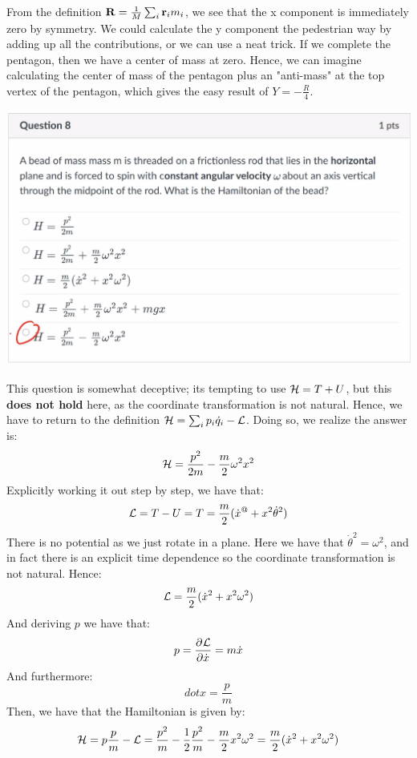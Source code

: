 \begin{s}
From the definition $\mathbf{R} = \frac{1}{M}\sum_i \mathbf{r}_im_i$, we see that the x component is immediately zero by symmetry. We could calculate the y component the pedestrian way by adding up all the contributions, or we can use a neat trick. If we complete the pentagon, then we have a center of mass at zero. Hence, we can imagine calculating the center of mass of the pentagon plus an "anti-mass" at the top vertex of the pentagon, which gives the easy result of $Y = -\frac{R}{4}$.
\end{s}

\begin{center}
    \includegraphics[scale=0.7]{Lecture-34/l34-img5.png}
\end{center}
\begin{s}
This question is somewhat deceptive; its tempting to use $\mathcal{H} = T + U$, but this \textbf{does not hold} here, as the coordinate transformation is not natural. Hence, we have to return to the definition $\mathcal{H} = \sum_i p_i\dot{q}_i - \mathcal{L}$. Doing so, we realize the answer is:
\[\mathcal{H} = \frac{p^2}{2m} - \frac{m}{2}\omega^2 x^2\]
Explicitly working it out step by step, we have that:
\[\mathcal{L} = T - U = T = \frac{m}{2}(\dot{x}^@ + x^2\dot{\theta}^2) \]
There is no potential as we just rotate in a plane. Here we have that $\dot{\theta}^2 = \omega^2$, and in fact there is an explicit time dependence so the coordinate transformation is not natural. Hence:
\[\mathcal{L} = \frac{m}{2}(\dot{x}^2 + x^2\omega^2)\]
And deriving $p$ we have that:
\[p = \dpd{\LL}{\dot{x}} = m\dot{x}\]
And furthermore:
\[dot{x} = \frac{p}{m}\]
Then, we have that the Hamiltonian is given by:
\[\mathcal{H} = p\frac{p}{m} - \mathcal{L} = \frac{p^2}{m} - \frac{1}{2}\frac{p^2}{m} - \frac{m}{2}x^2\omega^2 = \frac{m}{2}(\dot{x}^2 + x^2\omega^2)\]
\end{s}

